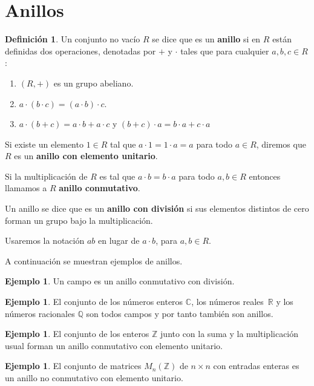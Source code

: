\documentclass[12pt]{book}
\theoremstyle{definition}
\newtheorem{definition}[theorem]{Definición}
\newtheorem{example}[theorem]{Ejemplo}
\newcounter{in}
\newcounter{ini}
\begin{document}
\section{Anillos}
\label{anillos}

\begin{definition}
  Un conjunto no vacío $R$ se dice que es un \textbf{anillo} si en $R$
  están definidas dos operaciones, denotadas por $+$ y $\cdot$ tales
  que para cualquier $a,b,c \in R$:
  \begin{enumerate}
  \item $(R,+)$ es un grupo abeliano.
  \item $a\cdot (b\cdot c)=(a\cdot b)\cdot c$.
  \item $a\cdot (b+c)=a\cdot b+a\cdot c$ y $(b+c)\cdot a=b\cdot a+c\cdot a$
  \end{enumerate}

  Si existe un elemento $1\in R$ tal que $a\cdot 1=1\cdot a=a$ para todo
  $a\in R$, diremos que $R$ es un \textbf{anillo con elemento
    unitario}.
  
  Si la multiplicación de $R$ es tal que $a\cdot b=b\cdot a$ para todo
  $a,b\in R$ entonces llamamos a $R$ \textbf{anillo conmutativo}.

  Un anillo se dice que es un \textbf{anillo con división} si sus
  elementos distintos de cero forman un grupo bajo la multiplicación.

  Usaremos la notación $ab$ en lugar de $a\cdot b$, para $a,b\in R$.
\end{definition}
A continuación se muestran ejemplos de anillos.
\begin{example}
  Un campo es un anillo conmutativo con división.
\end{example}

\begin{example}
  El conjunto de los números enteros $\mathbb{C}$, los números reales~$\mathbb{R}$ y los números racionales $\mathbb{Q}$ son todos campos
  y por tanto también son anillos.
\end{example}

\begin{example}
  El conjunto de los enteros $\mathbb{Z}$ junto con la suma y la
  multiplicación usual forman un anillo conmutativo con elemento unitario.
\end{example}

\begin{example}
  El conjunto de matrices $M_{n}(\mathbb{Z})$ de $n\times n$ con
  entradas enteras es un anillo no conmutativo con elemento unitario.
\end{example}
\end{document}
